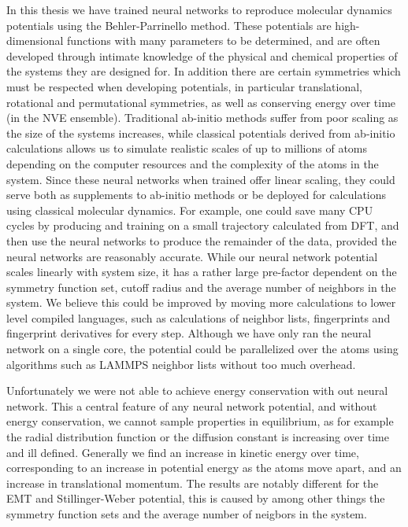 In this thesis we have trained neural networks to reproduce
molecular dynamics potentials using the Behler-Parrinello method.
These potentials are high-dimensional functions with many parameters
to be determined, and are often developed through intimate knowledge
of the physical and chemical properties of the systems they are designed for.
In addition there are certain symmetries which must be respected when
developing potentials, in particular translational, rotational and permutational
symmetries, as well as conserving energy over time (in the NVE ensemble).
Traditional ab-initio methods suffer from poor scaling as the size of the systems
increases, while classical potentials derived from ab-initio calculations
allows us to simulate realistic scales of up to millions of atoms
depending on the computer resources and the complexity of the atoms in the system.
Since these neural networks when trained offer linear scaling,
they could serve both as supplements to ab-initio methods
or be deployed for calculations using classical molecular dynamics.
For example, one could save many CPU cycles by producing and training
on a small trajectory calculated from DFT, and then use the neural networks
to produce the remainder of the data, provided the neural networks
are reasonably accurate.
While our neural network potential scales linearly with system size,
it has a rather large pre-factor dependent on the symmetry function set,
cutoff radius and the average number of neighbors in the system.
We believe this could be improved by moving more calculations to lower
level compiled languages, such as calculations of neighbor lists,
fingerprints and fingerprint derivatives for every step.
Although we have only ran the neural network on a single core,
the potential could be parallelized over the atoms
using algorithms such as LAMMPS neighbor lists without
too much overhead.
\par
Unfortunately we were not able to achieve energy conservation
with out neural network. This a central feature of any neural network potential,
and without energy conservation, we cannot sample properties in equilibrium,
as for example the radial distribution function or the diffusion constant
is increasing over time and ill defined.
Generally we find an increase in kinetic energy over time, corresponding
to an increase in potential energy as the atoms move apart,
and an increase in translational momentum.
The results are notably different for the EMT and Stillinger-Weber potential,
this is caused by among other things the symmetry function sets and the
average number of neigbors in the system.

